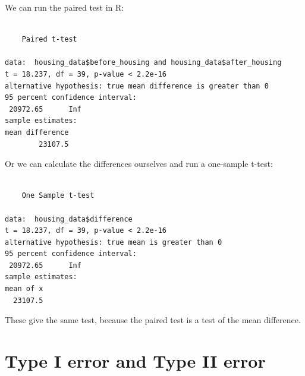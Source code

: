 \documentclass[
  letterpaper,
  DIV=11,
  numbers=noendperiod]{scrreprt}
\newenvironment{Shaded}{\begin{snugshade}}{\end{snugshade}}
\newcommand{\AttributeTok}[1]{\textcolor[rgb]{0.40,0.45,0.13}{#1}}
\newcommand{\ConstantTok}[1]{\textcolor[rgb]{0.56,0.35,0.01}{#1}}
\newcommand{\DecValTok}[1]{\textcolor[rgb]{0.68,0.00,0.00}{#1}}
\newcommand{\FunctionTok}[1]{\textcolor[rgb]{0.28,0.35,0.67}{#1}}
\newcommand{\NormalTok}[1]{\textcolor[rgb]{0.00,0.23,0.31}{#1}}
\newcommand{\SpecialCharTok}[1]{\textcolor[rgb]{0.37,0.37,0.37}{#1}}
\newcommand{\StringTok}[1]{\textcolor[rgb]{0.13,0.47,0.30}{#1}}
\begin{document}
We can run the paired test in R:

\begin{Shaded}
\end{Shaded}

\begin{verbatim}

    Paired t-test

data:  housing_data$before_housing and housing_data$after_housing
t = 18.237, df = 39, p-value < 2.2e-16
alternative hypothesis: true mean difference is greater than 0
95 percent confidence interval:
 20972.65      Inf
sample estimates:
mean difference 
        23107.5 
\end{verbatim}

Or we can calculate the differences ourselves and run a one-sample
t-test:

\begin{Shaded}
\end{Shaded}

\begin{verbatim}

    One Sample t-test

data:  housing_data$difference
t = 18.237, df = 39, p-value < 2.2e-16
alternative hypothesis: true mean is greater than 0
95 percent confidence interval:
 20972.65      Inf
sample estimates:
mean of x 
  23107.5 
\end{verbatim}

These give the same test, because the paired test is a test of the mean
difference.

\section{Type I error and Type II
error}\label{type-i-error-and-type-ii-error}
\end{document}
